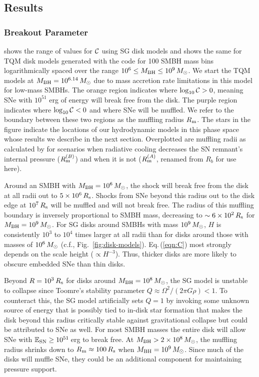 
\subsection{Results} \label{sec:results-snhydro}

\subsubsection{Breakout Parameter}
 shows the range of values for $\mathcal{C}$ using SG disk models and  shows the same for TQM disk models generated with the  code for 100 SMBH mass bins logarithmically spaced over the range $10^6 \leq M_{\rm BH} \leq 10^9\,M_{\odot}$.
We start the TQM models at $M_{\rm BH}=10^{6.14}\,M_{\odot}$ due to mass accretion rate limitations in this model for low-mass SMBHs.
The orange region indicates where $\log_{10}\mathcal{C}>0$, meaning SNe with $10^{51}$ erg of energy will break free from the disk.
The purple region indicates where $\log_{10}\mathcal{C}<0$ and where SNe will be muffled.
We refer to the boundary between these two regions as the muffling radius $R_{\rm m}$.
The stars in the figure indicate the locations of our hydrodynamic models in this phase space whose results we describe in the next section.
Overplotted are muffling radii as calculated by \citet{Moranchel+21} for scenarios when radiative cooling decreases the SN remnant's internal pressure ($R_{\rm m}^{(B)}$) and when it is not ($R_{\rm m}^{(A)}$, renamed from $R_b$ for use here).

Around an SMBH with $M_{\rm BH}=10^6\,M_{\odot}$, the shock will break free from the disk at all radii out to $5\times10^6\,R_{\rm s}$.
Shocks from SNe beyond this radius out to the disk edge at $10^7\,R_{\rm s}$ will be muffled and will not break free.
The radius of this muffling boundary is inversely proportional to SMBH mass, decreasing to $\sim 6\times10^2\,R_{\rm s}$ for $M_{\rm BH}=10^9\,M_{\odot}$.
For SG disks around SMBHs with mass $10^9\,M_{\odot}$, $H$ is consistently $10^3$ to $10^4$ times larger at all radii than for disks around those with masses of $10^6\,M_{\odot}$ (c.f., Fig.~\ref{fig:disk-models}).
Eq.\,(\ref{eqn:C}) most strongly depends on the scale height ($\propto H^{-3}$).
Thus, thicker disks are more likely to obscure embedded SNe than thin disks.

Beyond $R=10^3\,R_{\rm s}$ for disks around $M_{\rm BH}=10^8\,M_{\odot}$, the SG model is unstable to collapse since Toomre's stability parameter $Q\approx\Omega^2/(2\pi G\rho) < 1$.
To counteract this, the SG model artificially sets $Q=1$ by invoking some unknown source of energy that is possibly tied to in-disk star formation that makes the disk beyond this radius critically stable against gravitational collapse but could be attributed to SNe as well.
For most SMBH masses the entire disk will allow SNe with $\mathbb{E}_{\rm SN}\geq10^{51}$\,erg to break free.
At $M_{\rm BH}> 2\times10^8\,M_{\odot}$, the muffling radius shrinks down to $R_{\rm m}\approx100\,R_{\rm s}$ when $M_{\rm BH}=10^9\,M_{\odot}$.
Since much of the disks will muffle SNe, they could be an additional component for maintaining pressure support.

